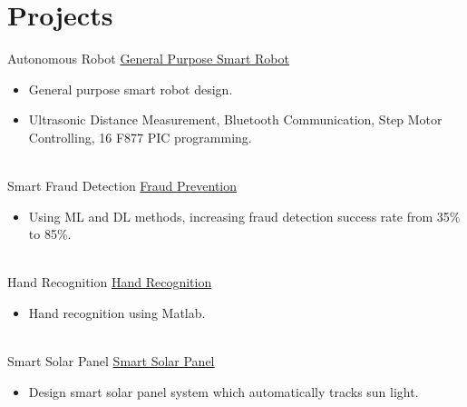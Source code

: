 \documentclass[letterpaper]{onur_class_file} %
\begin{document}
\section{Projects}

\begin{twenty} %
	\twentyitem
	{Autonomous}
	{Robot}
	{\hspace{0.3cm}\href{https://github.com/tufekciogluonur/General-Purpose-Autonomous-Robot}{ General Purpose Smart Robot}}
	{}
	{}
	{
	\begin{itemize}
			\item General purpose smart robot design.
			\item Ultrasonic Distance Measurement, Bluetooth Communication, Step Motor Controlling, 16 F877 PIC programming.      
	\end{itemize}
	}
	\\
	\twentyitem
	{Smart Fraud}
	{Detection}
	{\hspace{0.3cm}\href{https://github.com/tufekciogluonur/Fraud-Risk-Management-in-GSM-Systems}{Fraud Prevention}}
	{}
	{}
	{
		\begin{itemize}
			\item Using ML and DL methods, increasing fraud detection success rate from 35\% to 85\%.     
		\end{itemize}
	}
	\\
	\twentyitem
	{Hand }
	{Recognition}
	{\hspace{0.3cm}\href{https://github.com/tufekciogluonur/Hand-Recognition-Using-Matlab}{Hand Recognition} } 
	{}
	{}
	{
		{\begin{itemize}
				\item Hand recognition using Matlab.
		\end{itemize}}
	}
	\\
	\twentyitem
	{Smart}
	{Solar Panel}
	{\hspace{0.3cm}\href{https://github.com/tufekciogluonur/Smart-Sun-Tracking-Solar-Panel-Design}{Smart Solar Panel}}
	{}
	{}
	{
		{\begin{itemize}
				\item Design smart solar panel system which automatically tracks sun light. 
		\end{itemize}}
	}
	
\end{twenty}
\end{document}
